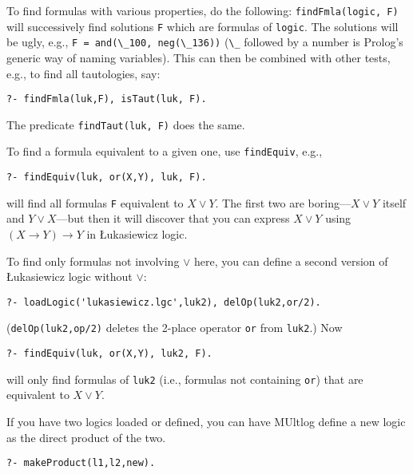 \documentclass[]{article}
\newcommand{\passthrough}[1]{#1}
\begin{document}
To find formulas with various properties, do the following:
\passthrough{\lstinline!findFmla(logic, F)!} will successively find
solutions \passthrough{\lstinline!F!} which are formulas of
\passthrough{\lstinline!logic!}. The solutions will be ugly, e.g.,
\passthrough{\lstinline!F = and(\_100, neg(\_136))!}
(\passthrough{\lstinline!\_!} followed by a number is Prolog's generic
way of naming variables). This can then be combined with other tests,
e.g., to find all tautologies, say:

\begin{lstlisting}
?- findFmla(luk,F), isTaut(luk, F).
\end{lstlisting}

The predicate \passthrough{\lstinline!findTaut(luk, F)!} does the same.

To find a formula equivalent to a given one, use
\passthrough{\lstinline!findEquiv!}, e.g.,

\begin{lstlisting}
?- findEquiv(luk, or(X,Y), luk, F).
\end{lstlisting}

will find all formulas \passthrough{\lstinline!F!} equivalent to
\(X \lor Y\). The first two are boring---\(X \lor Y\) itself and
\(Y \lor X\)---but then it will discover that you can express
\(X \lor Y\) using \((X \to Y) \to Y\) in Łukasiewicz logic.

To find only formulas not involving \(\lor\) here, you can define a
second version of Łukasiewicz logic without \(\lor\):

\begin{lstlisting}
?- loadLogic('lukasiewicz.lgc',luk2), delOp(luk2,or/2).
\end{lstlisting}

(\passthrough{\lstinline!delOp(luk2,op/2)!} deletes the 2-place operator
\passthrough{\lstinline!or!} from \passthrough{\lstinline!luk2!}.) Now

\begin{lstlisting}
?- findEquiv(luk, or(X,Y), luk2, F).
\end{lstlisting}

will only find formulas of \passthrough{\lstinline!luk2!} (i.e.,
formulas not containing \passthrough{\lstinline!or!}) that are
equivalent to \(X \lor Y\).

If you have two logics loaded or defined, you can have MUltlog define a
new logic as the direct product of the two.

\begin{lstlisting}
?- makeProduct(l1,l2,new).
\end{lstlisting}
\end{document}
